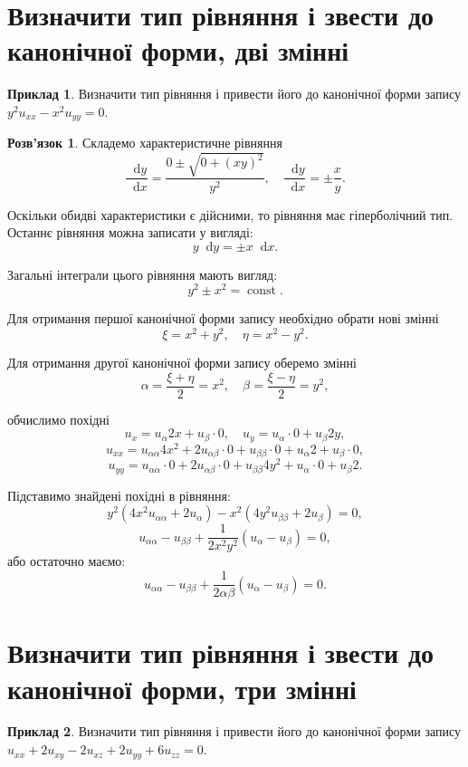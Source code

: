 \documentclass[a4paper, 12pt]{article}
\theoremstyle{definition}
\newtheorem*{example*}{Приклад}
\newtheorem*{solution*}{Розв'язок}
\DeclareMathOperator{\const}{const}
\newcommand*\diff{\mathop{}\!\mathrm{d}}
\begin{document}
\section{Визначити тип рівняння і звести до канонічної форми, дві змінні}

\begin{example*}
	Визначити тип рівняння і привести його до канонічної форми запису $y^2 u_{xx} - x^2 u_{yy} = 0$.
\end{example*}

\begin{solution*}
	Складемо характеристичне рівняння \[ \dfrac{\diff y}{\diff x} = \dfrac{0\pm\sqrt{0+(xy)^2}}{y^2}, \quad \dfrac{\diff y}{\diff x} = \pm\dfrac{x}{y}. \]

	Оскільки обидві характеристики є дійсними, то рівняння має гіперболічний тип. Останнє рівняння можна записати у вигляді: \[y \diff y = \pm x \diff x.\]

	Загальні інтеграли цього рівняння мають вигляд: \[y^2 \pm x^2 = \const.\]

	Для отримання першої канонічної форми запису необхідно обрати нові змінні \[\xi = x^2 + y^2,\quad \eta = x^2 - y^2. \]

	Для отримання другої канонічної форми запису оберемо змінні \[ \alpha = \dfrac{\xi + \eta}{2} = x^2, \quad \beta = \dfrac{\xi-\eta}{2} = y^2, \]

	обчислимо похідні 
	\[ u_x = u_\alpha 2 x + u_\beta \cdot 0, \quad u_y = u_\alpha \cdot 0 + u_\beta 2 y, \]
	\[ u_{xx} = u_{\alpha\alpha} 4x^2 + 2 u_{\alpha\beta} \cdot 0 + u_{\beta\beta} \cdot 0 + u_\alpha 2 + u_\beta \cdot 0, \]
	\[ u_{yy} = u_{\alpha\alpha} \cdot 0 + 2 u_{\alpha\beta} \cdot 0 + u_{\beta\beta} 
	4y^2 + u_\alpha \cdot 0 + u_\beta 2. \]

	Підставимо знайдені похідні в рівняння:
	\[ y^2(4x^2u_{\alpha\alpha} + 2u_\alpha) - x^2(4y^2u_{\beta\beta} + 2u_\beta) = 0, \]
	\[ u_{\alpha\alpha} - u_{\beta\beta} + \dfrac{1}{2x^2y^2}(u_\alpha - u_\beta) = 0, \]
	або остаточно маємо:
	\[ u_{\alpha\alpha} - u_{\beta\beta} + \dfrac{1}{2\alpha\beta}(u_\alpha - u_\beta) = 0. \]
\end{solution*}

\newpage

\section{Визначити тип рівняння і звести до канонічної форми, три змінні}

\begin{example*}
	Визначити тип рівняння і привести його до канонічної форми запису $u_{xx} + 2 u_{xy} - 2 u_{xz} + 2 u_{yy} + 6 u_{zz} = 0$.
\end{example*}
\end{document}
